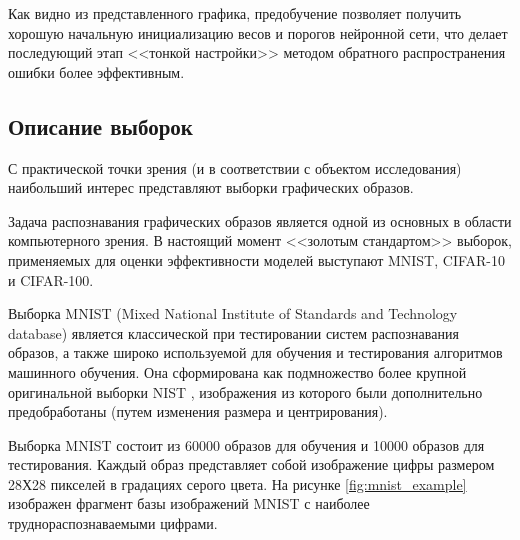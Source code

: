 Как видно из представленного графика, предобучение позволяет получить хорошую начальную инициализацию весов и порогов нейронной сети, что делает последующий этап <<тонкой настройки>> методом обратного распространения ошибки более эффективным.

\subsection{Описание выборок}

С практической точки зрения (и в соответствии с объектом исследования) наибольший интерес представляют выборки графических образов.

Задача распознавания графических образов является одной из основных в области компьютерного зрения. В настоящий момент <<золотым стандартом>> выборок, применяемых для оценки эффективности моделей выступают MNIST, CIFAR-10 и CIFAR-100. %

Выборка MNIST (Mixed National Institute of Standards and Technology database) является классической при тестировании систем распознавания образов, а также широко используемой для обучения и тестирования алгоритмов машинного обучения. Она сформирована как подмножество более крупной оригинальной выборки NIST \cite{mnist}, изображения из которого были дополнительно предобработаны (путем изменения размера и центрирования). 

Выборка MNIST состоит из 60000 образов для обучения и 10000 образов для тестирования. Каждый образ представляет собой изображение цифры размером 28Х28 пикселей в градациях серого цвета. На рисунке \ref{fig:mnist_example} изображен фрагмент базы изображений MNIST с наиболее труднораспознаваемыми цифрами.

